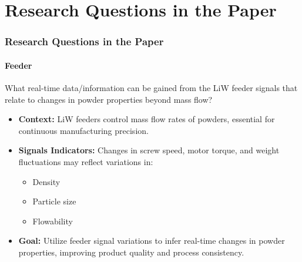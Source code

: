 \documentclass[light]{lutbeamer} %
\begin{document}
{ %
}
\section{Research Questions in the Paper}
\begin{frame}
    \frametitle{Research Questions in the Paper}
    \framesubtitle{Feeder}

    What real-time data/information can be gained  from the LiW feeder signals that relate to changes in  powder properties beyond mass flow?

    \begin{itemize}
        \item \textbf{Context:} LiW feeders control mass flow rates of powders, essential for continuous manufacturing precision.
        \item \textbf{Signals Indicators:} Changes in screw speed, motor torque, and weight fluctuations may reflect variations in:
              \begin{itemize}
                  \item Density
                  \item Particle size
                  \item Flowability
              \end{itemize}
        \item \textbf{Goal:} Utilize feeder signal variations to infer real-time changes in powder properties, improving product quality and process consistency.
    \end{itemize}
\end{frame}
\end{document}
